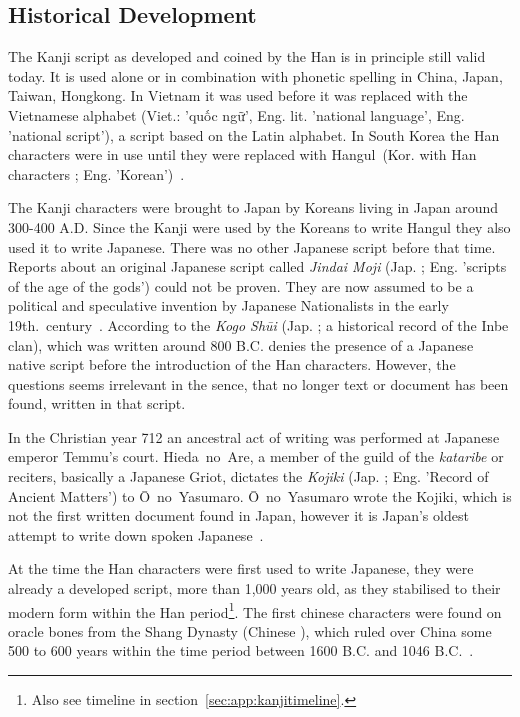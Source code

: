 \subsection{Historical Development}
\label{sec:historicaldevelopmentofjapanesescript}

The Kanji script as developed and coined by the Han is in principle still valid 
today. It is used alone or in combination with phonetic spelling in China, Japan,
Taiwan, Hongkong. In Vietnam it was used before it was replaced with the 
Vietnamese alphabet (Viet.: 'quốc ngữ', Eng. lit. 'national language', Eng. 
'national script'), a script based on the Latin alphabet. In South Korea the Han 
characters were in use until they were replaced with 
Hangul~(Kor. with Han characters ; Eng. 'Korean')~.

The Kanji characters were brought to Japan by Koreans living in Japan around 
300-400 A.D. Since the Kanji were used by the Koreans to write 
Hangul they also used it to write Japanese. There was no other Japanese script 
before that time. Reports about an original Japanese script called 
\emph{Jindai Moji} (Jap. ; Eng. 'scripts of the age of the gods')
could not be proven. They are now assumed to be a political and speculative 
invention by Japanese Nationalists in the early 
19th.~century~. According to 
the \emph{Kogo Shūi} (Jap. ; a historical record of the Inbe clan),
which was written around 800 B.C. denies the presence of a Japanese native
script before the introduction of the Han characters. However, the questions
seems irrelevant in the sence, that no longer text or document has been found,
written in that script.

In the Christian year 712 an ancestral act of writing was performed at 
Japanese emperor Temmu's court. Hieda~no~Are, a member of the guild of the 
\emph{kataribe} or reciters, basically a Japanese Griot, dictates the 
\emph{Kojiki} (Jap. ; Eng. 'Record of Ancient Matters') to 
Ō~no~Yasumaro. Ō~no~Yasumaro wrote the Kojiki, which is not the first written 
document found in Japan, however it is Japan's oldest attempt to write down 
spoken Japanese~.

At the time the Han characters were first used to write Japanese, 
they were already a developed script, more than 1,000 years old, 
as they stabilised to their modern form within the Han 
period\footnote{Also see timeline in section~\ref{sec:app:kanjitimeline}.}.
The first chinese characters were found on oracle bones from the Shang Dynasty
(Chinese ), which ruled over China some 500 to 600 years within the 
time period between 1600 B.C. and 1046 B.C.~.

